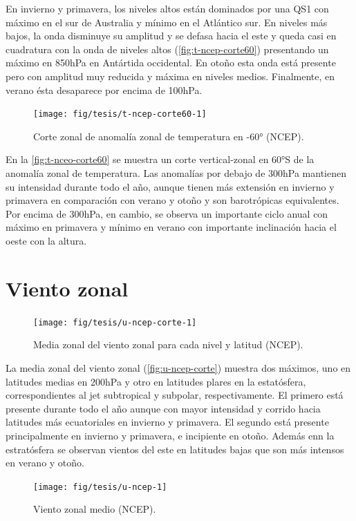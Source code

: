 \documentclass[spanish,a4paper,12pt,oneside]{book}
\begin{document}
En invierno y primavera, los niveles altos están dominados por una QS1
con máximo en el sur de Australia y mínimo en el Atlántico sur. En
niveles más bajos, la onda disminuye su amplitud y se defasa hacia el
este y queda casi en cuadratura con la onda de niveles altos
(\autoref{fig:t-ncep-corte60}) presentando un máximo en 850hPa en
Antártida occidental. En otoño esta onda está presente pero con amplitud
muy reducida y máxima en niveles medios. Finalmente, en verano ésta
desaparece por encima de 100hPa.

\begin{figure}
\texttt{[image: fig/tesis/t-ncep-corte60-1]} \caption{Corte zonal de anomalía zonal de temperatura en -60° (NCEP).}\label{fig:t-ncep-corte60}
\end{figure}

En la \autoref{fig:t-nceo-corte60} se muestra un corte vertical-zonal en
60°S de la anomalía zonal de temperatura. Las anomalías por debajo de
300hPa mantienen su intensidad durante todo el año, aunque tienen más
extensión en invierno y primavera en comparación con verano y otoño y
son barotrópicas equivalentes. Por encima de 300hPa, en cambio, se
observa un importante ciclo anual con máximo en primavera y mínimo en
verano con importante inclinación hacia el oeste con la altura.

\section{Viento zonal}\label{viento-zonal}

\begin{figure}
\texttt{[image: fig/tesis/u-ncep-corte-1]} \caption{Media zonal del viento zonal para cada nivel y latitud (NCEP).}\label{fig:u-ncep-corte}
\end{figure}

La media zonal del viento zonal (\autoref{fig:u-ncep-corte}) muestra dos
máximos, uno en latitudes medias en 200hPa y otro en latitudes plares en
la estatósfera, correspondientes al jet subtropical y subpolar,
respectivamente. El primero está presente durante todo el año aunque con
mayor intensidad y corrido hacia latitudes más ecuatoriales en invierno
y primavera. El segundo está presente principalmente en invierno y
primavera, e incipiente en otoño. Además enn la estratósfera se observan
vientos del este en latitudes bajas que son más intensos en verano y
otoño.

\begin{landscape}\begin{figure}

{\centering \texttt{[image: fig/tesis/u-ncep-1]} 

}

\caption{Viento zonal medio (NCEP).}\label{fig:u-ncep}
\end{figure}
\end{landscape}
\end{document}
